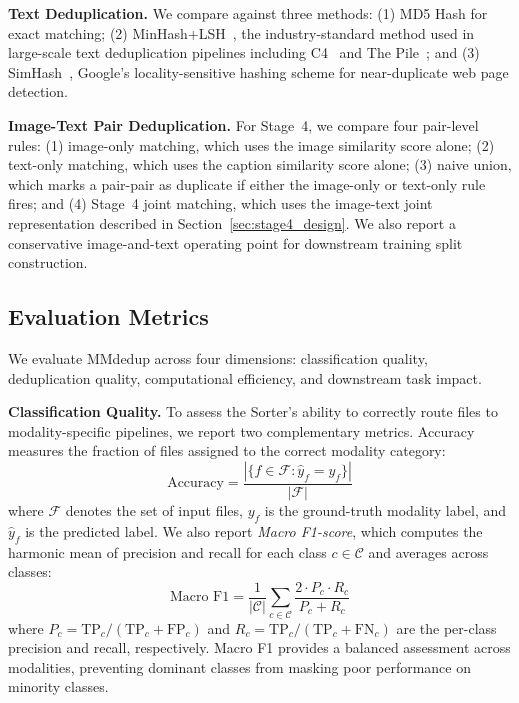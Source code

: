 \documentclass[conference]{IEEEtran}
\begin{document}
\textbf{Text Deduplication.} We compare against three methods: (1) MD5 Hash for exact matching; (2) MinHash+LSH~\cite{broder1997resemblance}, the industry-standard method used in large-scale text deduplication pipelines including C4~\cite{raffel2020exploring} and The Pile~\cite{gao2020pile}; and (3) SimHash~\cite{charikar2002similarity}, Google's locality-sensitive hashing scheme for near-duplicate web page detection.

\textbf{Image-Text Pair Deduplication.} For Stage~4, we compare four pair-level rules: (1) image-only matching, which uses the image similarity score alone; (2) text-only matching, which uses the caption similarity score alone; (3) naive union, which marks a pair-pair as duplicate if either the image-only or text-only rule fires; and (4) Stage~4 joint matching, which uses the image-text joint representation described in Section~\ref{sec:stage4_design}. We also report a conservative image-and-text operating point for downstream training split construction.

\subsection{Evaluation Metrics}

We evaluate MMdedup across four dimensions: classification quality, deduplication quality, computational efficiency, and downstream task impact.

\textbf{Classification Quality.} To assess the Sorter's ability to correctly route files to modality-specific pipelines, we report two complementary metrics. Accuracy measures the fraction of files assigned to the correct modality category:
\begin{equation}
\text{Accuracy} = \frac{|\{f \in \mathcal{F} : \hat{y}_f = y_f\}|}{|\mathcal{F}|}
\end{equation}
where $\mathcal{F}$ denotes the set of input files, $y_f$ is the ground-truth modality label, and $\hat{y}_f$ is the predicted label. We also report \emph{Macro F1-score}, which computes the harmonic mean of precision and recall for each class $c \in \mathcal{C}$ and averages across classes:
\begin{equation}
\text{Macro F1} = \frac{1}{|\mathcal{C}|} \sum_{c \in \mathcal{C}} \frac{2 \cdot P_c \cdot R_c}{P_c + R_c}
\end{equation}
where $P_c = \text{TP}_c / (\text{TP}_c + \text{FP}_c)$ and $R_c = \text{TP}_c / (\text{TP}_c + \text{FN}_c)$ are the per-class precision and recall, respectively. Macro F1 provides a balanced assessment across modalities, preventing dominant classes from masking poor performance on minority classes.
\end{document}
